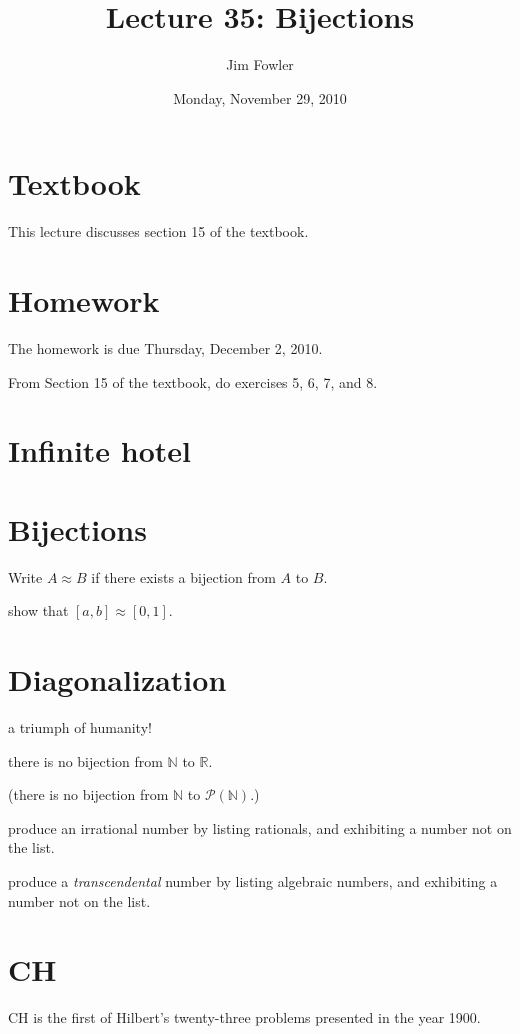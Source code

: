 \documentclass[12pt]{handout}
\title{Lecture 35: Bijections}
\author{Jim Fowler}
\date{Monday, November 29, 2010}
\begin{document}
\maketitle

\section*{Textbook}

This lecture discusses section 15 of the textbook.


\section*{Homework} 

The homework is due Thursday, December  2, 2010.

From Section 15 of the textbook, do exercises 5, 6, 7, and 8.

\section*{Infinite hotel}

\section*{Bijections}

Write $A \approx B$ if there exists a bijection from $A$ to $B$.

show that $[a,b] \approx [0,1]$.

\section*{Diagonalization}

a triumph of humanity!

there is no bijection from $\mathbb{N}$ to $\mathbb{R}$.

(there is no bijection from $\mathbb{N}$ to $\mathcal{P}(\mathbb{N})$.)

produce an irrational number by listing rationals, and exhibiting a
number not on the list.

produce a \textit{transcendental} number by listing algebraic numbers,
and exhibiting a number not on the list.

\section*{CH}

CH is the first of Hilbert's twenty-three problems presented in the
year 1900.
\end{document}
